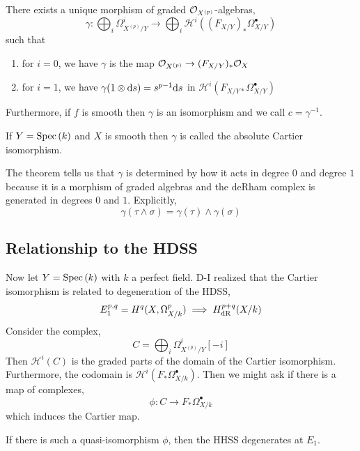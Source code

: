 \documentclass[12pt]{article}
\begin{document}
\renewcommand{\H}{\mathcal{H}}

\begin{theorem}[Cartier]
There exists a unique morphism of graded $\mathcal{O}_{X^{(p)}}$-algebras,
\[ \gamma : \bigoplus_{i} \Omega^i_{X^{(p)}/Y} \to \bigoplus_i \H^i((F_{X/Y})_* \Omega^\bullet_{X/Y}) \]
such that
\begin{enumerate}
\item for $i = 0$, we have $\gamma$ is the map $\mathcal{O}_{X^{(p)}} \to (F_{X/Y})_* \mathcal{O}_{X}$
\item for $i = 1$, we have $\gamma(1 \otimes \mathrm{d}{s}) = s^{p-1} \mathrm{d}{s}$ in $\H^i(F_{X/Y*} \Omega^\bullet_{X/Y})$
\end{enumerate}
Furthermore, if $f$ is smooth then $\gamma$ is an isomorphism and we call $c = \gamma^{-1}$.
\end{theorem}

\begin{rmk}
If $Y = \mathrm{Spec}\left( k \right)$ and $X$ is smooth then $\gamma$ is called the absolute Cartier isomorphism. 
\end{rmk}

\begin{rmk}
The theorem tells us that $\gamma$ is determined by how it acts in degree $0$ and degree $1$ because it is a morphism of graded algebras and the deRham complex is generated in degrees $0$ and $1$. Explicitly,
\[ \gamma(\tau \wedge \sigma) = \gamma(\tau) \wedge \gamma(\sigma) \]
\end{rmk}

\subsection{Relationship to the HDSS}

Now let $Y = \mathrm{Spec}\left( k \right)$ with $k$ a perfect field.
D-I realized that the Cartier isomorphism is related to degeneration of the HDSS,
\[ E_1^{p,q} = H^q(X, \Omega_{X/k}^p) \implies H^{p+q}_{\mathrm{dR}}(X/k) \]
Consider the complex,
\[ C = \bigoplus_i \Omega^i_{X^{(p)}/Y} [-i] \]
Then $\H^i(C)$ is the graded parts of the domain of the Cartier isomorphism. Furthermore, the codomain is $\H^i(F_* \Omega^\bullet_{X/k})$. Then we might ask if there is a map of complexes,
\[ \phi : C \to F_* \Omega^\bullet_{X/k} \]
which induces the Cartier map. 

\begin{prop}
If there is such a quasi-isomorphism $\phi$, then the HHSS degenerates at $E_1$.
\end{prop}
\end{document}
